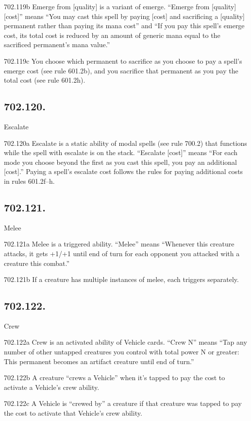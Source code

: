 702.119b Emerge from [quality] is a variant of emerge. “Emerge from [quality] [cost]” means “You may cast this spell by paying [cost] and sacrificing a [quality] permanent rather than paying its mana cost” and “If you pay this spell’s emerge cost, its total cost is reduced by an amount of generic mana equal to the sacrificed permanent’s mana value.”

702.119c You choose which permanent to sacrifice as you choose to pay a spell’s emerge cost (see rule 601.2b), and you sacrifice that permanent as you pay the total cost (see rule 601.2h).

\subsection*{702.120.}
Escalate

702.120a Escalate is a static ability of modal spells (see rule 700.2) that functions while the spell with escalate is on the stack. “Escalate [cost]” means “For each mode you choose beyond the first as you cast this spell, you pay an additional [cost].” Paying a spell’s escalate cost follows the rules for paying additional costs in rules 601.2f–h.

\subsection*{702.121.}
Melee

702.121a Melee is a triggered ability. “Melee” means “Whenever this creature attacks, it gets +1/+1 until end of turn for each opponent you attacked with a creature this combat.”

702.121b If a creature has multiple instances of melee, each triggers separately.

\subsection*{702.122.}
Crew

702.122a Crew is an activated ability of Vehicle cards. “Crew N” means “Tap any number of other untapped creatures you control with total power N or greater: This permanent becomes an artifact creature until end of turn.”

702.122b A creature “crews a Vehicle” when it’s tapped to pay the cost to activate a Vehicle’s crew ability.

702.122c A Vehicle is “crewed by” a creature if that creature was tapped to pay the cost to activate that Vehicle’s crew ability.

